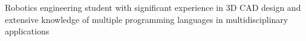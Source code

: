 Robotics engineering student with significant experience in 3D CAD design and extensive knowledge of
multiple programming languages in multidisciplinary applications
